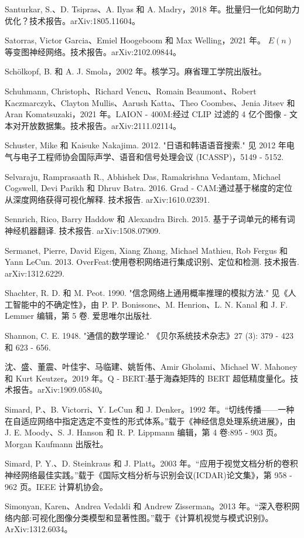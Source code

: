 \documentclass[10pt]{report}
\begin{document}
Santurkar, S.、D. Tsipras、A. Ilyas 和 A. Madry，2018 年。批量归一化如何助力优化？技术报告。arXiv:1805.11604。

Satorras, Victor Garcia、Emiel Hoogeboom 和 Max Welling，2021 年。 \(E\left( n\right)\) 等变图神经网络。技术报告。arXiv:2102.09844。

Schölkopf, B. 和 A. J. Smola，2002 年。核学习。麻省理工学院出版社。

Schuhmann, Christoph、Richard Vencu、Romain Beaumont、Robert Kaczmarczyk、Clayton Mullis、Aarush Katta、Theo Coombes、Jenia Jitsev 和 Aran Komatsuzaki，2021 年。LAION - 400M:经过 CLIP 过滤的 4 亿个图像 - 文本对开放数据集。技术报告。arXiv:2111.02114。

Schuster, Mike 和 Kaisuke Nakajima. 2012. "日语和韩语语音搜索." 见 2012 年电气与电子工程师协会国际声学、语音和信号处理会议 (ICASSP)，5149 - 5152.

Selvaraju, Ramprasaath R., Abhishek Das, Ramakrishna Vedantam, Michael Cogswell, Devi Parikh 和 Dhruv Batra. 2016. Grad - CAM:通过基于梯度的定位从深度网络获得可视化解释. 技术报告. arXiv:1610.02391.

Sennrich, Rico, Barry Haddow 和 Alexandra Birch. 2015. 基于子词单元的稀有词神经机器翻译. 技术报告. arXiv:1508.07909.

Sermanet, Pierre, David Eigen, Xiang Zhang, Michael Mathieu, Rob Fergus 和 Yann LeCun. 2013. OverFeat:使用卷积网络进行集成识别、定位和检测. 技术报告. arXiv:1312.6229.

Shachter, R. D. 和 M. Peot. 1990. "信念网络上通用概率推理的模拟方法." 见《人工智能中的不确定性》，由 P. P. Bonissone、M. Henrion、L. N. Kanal 和 J. F. Lemmer 编辑，第 5 卷. 爱思唯尔出版社.

Shannon, C. E. 1948. "通信的数学理论." 《贝尔系统技术杂志》27 (3): 379 - 423 和 623 - 656.

沈、盛、董震、叶佳宇、马临建、姚哲伟、Amir Gholami、Michael W. Mahoney 和 Kurt Keutzer。2019 年。Q - BERT:基于海森矩阵的 BERT 超低精度量化。技术报告。arXiv:1909.05840。

Simard, P.、B. Victorri、Y. LeCun 和 J. Denker。1992 年。“切线传播——一种在自适应网络中指定选定不变性的形式体系。”载于《神经信息处理系统进展》，由 J. E. Moody、S. J. Hanson 和 R. P. Lippmann 编辑，第 4 卷:895 - 903 页。Morgan Kaufmann 出版社。

Simard, P. Y.、D. Steinkraus 和 J. Platt。2003 年。“应用于视觉文档分析的卷积神经网络最佳实践。”载于《国际文档分析与识别会议(ICDAR)论文集》，第 958 - 962 页。IEEE 计算机协会。

Simonyan, Karen、Andrea Vedaldi 和 Andrew Zisserman。2013 年。“深入卷积网络内部:可视化图像分类模型和显著性图。”载于《计算机视觉与模式识别》。ArXiv:1312.6034。
\end{document}
